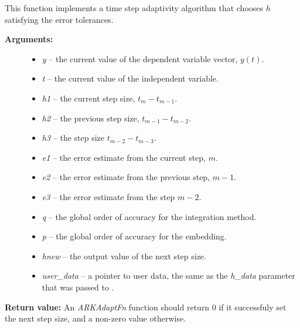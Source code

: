 \documentclass[letterpaper,10pt,english]{sphinxmanual}
\begin{document}
\begin{fulllineitems}
\label{c_interface/User_supplied:c.ARKAdaptFn}
This function implements a time step adaptivity algorithm
that chooses \(h\) satisfying the error tolerances.
\begin{description}
\item[{\textbf{Arguments:}}] \leavevmode\begin{itemize}
\item {} 
\emph{y} -- the current value of the dependent variable vector, \(y(t)\).

\item {} 
\emph{t} -- the current value of the independent variable.

\item {} 
\emph{h1} -- the current step size, \(t_m - t_{m-1}\).

\item {} 
\emph{h2} -- the previous step size, \(t_{m-1} - t_{m-2}\).

\item {} 
\emph{h3} -- the step size \(t_{m-2}-t_{m-3}\).

\item {} 
\emph{e1} -- the error estimate from the current step, \(m\).

\item {} 
\emph{e2} -- the error estimate from the previous step, \(m-1\).

\item {} 
\emph{e3} -- the error estimate from the step \(m-2\).

\item {} 
\emph{q} -- the global order of accuracy for the integration method.

\item {} 
\emph{p} -- the global order of accuracy for the embedding.

\item {} 
\emph{hnew} -- the output value of the next step size.

\item {} 
\emph{user\_data} -- a pointer to user data, the same as the
\emph{h\_data} parameter that was passed to {\hyperref[c_interface/User_callable:c.ARKodeSetAdaptivityFn]{\emph{}}}.

\end{itemize}

\end{description}

\textbf{Return value:}
An \emph{ARKAdaptFn} function should return 0 if it
successfuly set the next step size, and a non-zero value otherwise.

\end{fulllineitems}
\end{document}

